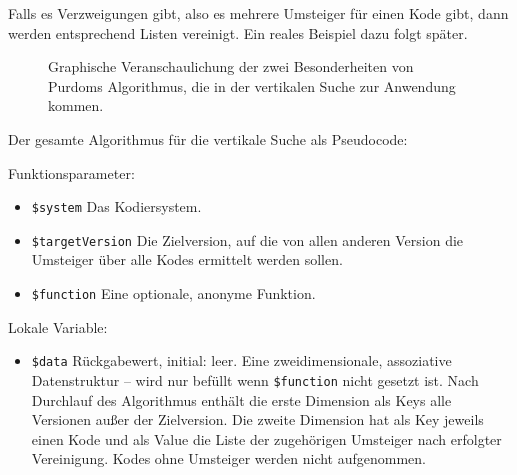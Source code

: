 Falls es Verzweigungen gibt, also es mehrere Umsteiger für einen Kode gibt, dann werden entsprechend Listen vereinigt. Ein reales Beispiel dazu folgt später. 

\begin{figure}[H]
    \centering\Huge%
    \resizebox{.75\linewidth}{!}{}
    \normalsize\caption{Graphische Veranschaulichung der zwei Besonderheiten von Purdoms Algorithmus, die in der vertikalen Suche zur Anwendung kommen.}
    \label{merge-illustrated}
\end{figure}

Der gesamte Algorithmus für die vertikale Suche als Pseudocode:


Funktionsparameter:

\begin{itemize}
\item \texttt{\$system} \newline Das Kodiersystem. 
\item \texttt{\$targetVersion} \newline Die Zielversion, auf die von allen anderen Version die Umsteiger über alle Kodes ermittelt werden sollen.
\item \texttt{\$function} \newline Eine optionale, anonyme Funktion.
\end{itemize}

Lokale Variable:

\begin{itemize}
\item \texttt{\$data} \hspace{2em} Rückgabewert, initial: leer.
\newline Eine zweidimensionale, assoziative Datenstruktur -- wird nur befüllt wenn \texttt{\$function} nicht gesetzt ist. Nach Durchlauf des Algorithmus enthält die erste Dimension als Keys alle Versionen außer der Zielversion. Die zweite Dimension hat als Key jeweils einen Kode und als Value die Liste der zugehörigen Umsteiger nach erfolgter Vereinigung. Kodes ohne Umsteiger werden nicht aufgenommen.
\end{itemize}


